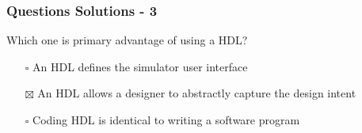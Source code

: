 \documentclass[t]{beamer}
\begin{document}
\begin{frame}
\frametitle{Questions Solutions - 3}

Which one is primary advantage of using a HDL?

\begin{itemize}
\item[$\square$] An HDL defines the simulator user interface
\item[$\boxtimes$] An HDL allows a designer to abstractly capture the design intent
\item[$\square$] Coding HDL is identical to writing a software program
\end{itemize}
\end{frame}
\end{document}
